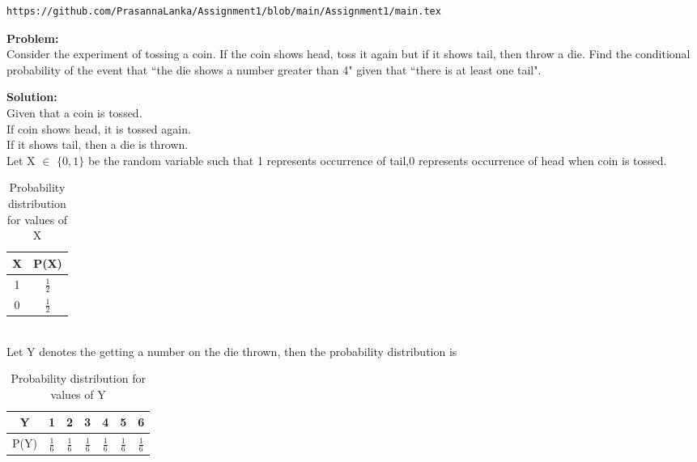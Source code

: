 \documentclass[journal,12pt,twocolumn]{IEEEtran}
\begin{document}
\maketitle
\newpage
\bigskip
{}
\begin{lstlisting}
https://github.com/PrasannaLanka/Assignment1/blob/main/Assignment1/main.tex
\end{lstlisting}
\item{\textbf{Problem:}}
\\
Consider the experiment of tossing a coin. If the coin shows head, toss it again but if it shows tail, then throw a die. Find the conditional probability of the event that ``the die shows a number greater than 4" given that ``there is at least one tail".
\item{\textbf{Solution:}}
\\
Given that a coin is tossed.
\\If coin shows head, it is tossed again.
\\If it shows tail, then a die is thrown.
\\Let X $\in$ $\{0,1\}$ be the random variable such that 1 represents occurrence of tail,0 represents occurrence of head when coin is tossed.
\begin{table}[ht]
\caption{Probability distribution for values of X}
\begin{center}
    \begin{tabular}{|c|c|}
    \hline
    X & P(X)\\
    \hline
    1 & $\frac{1}{2}$ \\
    \hline
    0 & $\frac{1}{2}$\\
    \hline
    \end{tabular}
\end{center} 
\end{table}
\\Let Y denotes the getting a number on the die thrown, then the probability distribution is
\begin{table}[ht]
\caption{Probability distribution for values of Y}
\begin{center}
    \begin{tabular}{|c|c|c|c|c|c|c|}
    \hline
    Y & 1 & 2 & 3 & 4 & 5 & 6 \\
    \hline
    P(Y) & $\frac{1}{6}$ & $\frac{1}{6}$ & $\frac{1}{6}$ & $\frac{1}{6}$ & $\frac{1}{6}$ & $\frac{1}{6}$  \\
    \hline
    \end{tabular}
\end{center} 
\end{table}
\end{document}
